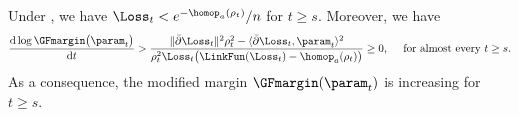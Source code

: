 \begin{theorem}
\label{thm:gamma-a-increase}
Under , we have  
$\Loss_t < e^{-\homop_a(\rho_t)}/n$ for $t\ge s$. Moreover, we have
\begin{equation}
\label{eq: gamma-c-increase}
\frac{\mathrm{d} \log \GFmargin \big(\param_t\big)}{\mathrm{d} t} > \frac{\| \bar \partial \Loss_t \|^2 \rho_t^2 - \langle  \bar \partial \Loss_t , \param_t \rangle^2  }{\rho_t^2\Loss_t \big (\LinkFun(\Loss_t) - \homop_a(\rho_t)\big)} \ge 0,\quad \text{ for almost every } t\ge s.
\end{equation}
As a consequence, the modified margin $\GFmargin(\param_t)$ is increasing for $t\ge s$. 
\end{theorem}
